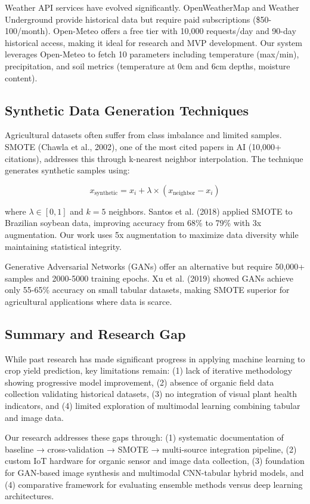\documentclass[10pt,twocolumn]{article}
\begin{document}
Weather API services have evolved significantly. OpenWeatherMap and Weather Underground provide historical data but require paid subscriptions (\$50-100/month). Open-Meteo offers a free tier with 10,000 requests/day and 90-day historical access, making it ideal for research and MVP development. Our system leverages Open-Meteo to fetch 10 parameters including temperature (max/min), precipitation, and soil metrics (temperature at 0cm and 6cm depths, moisture content).

\subsection{Synthetic Data Generation Techniques}
Agricultural datasets often suffer from class imbalance and limited samples. SMOTE (Chawla et al., 2002), one of the most cited papers in AI (10,000+ citations), addresses this through k-nearest neighbor interpolation. The technique generates synthetic samples using:

\[
x_{\text{synthetic}} = x_i + \lambda \times (x_{\text{neighbor}} - x_i)
\]

where $\lambda \in [0,1]$ and $k=5$ neighbors. Santos et al. (2018) applied SMOTE to Brazilian soybean data, improving accuracy from 68\% to 79\% with 3x augmentation. Our work uses 5x augmentation to maximize data diversity while maintaining statistical integrity.

Generative Adversarial Networks (GANs) offer an alternative but require 50,000+ samples and 2000-5000 training epochs. Xu et al. (2019) showed GANs achieve only 55-65\% accuracy on small tabular datasets, making SMOTE superior for agricultural applications where data is scarce.

\subsection{Summary and Research Gap}
While past research has made significant progress in applying machine learning to crop yield prediction, key limitations remain: (1) lack of iterative methodology showing progressive model improvement, (2) absence of organic field data collection validating historical datasets, (3) no integration of visual plant health indicators, and (4) limited exploration of multimodal learning combining tabular and image data.

Our research addresses these gaps through: (1) systematic documentation of baseline → cross-validation → SMOTE → multi-source integration pipeline, (2) custom IoT hardware for organic sensor and image data collection, (3) foundation for GAN-based image synthesis and multimodal CNN-tabular hybrid models, and (4) comparative framework for evaluating ensemble methods versus deep learning architectures.
\end{document}
